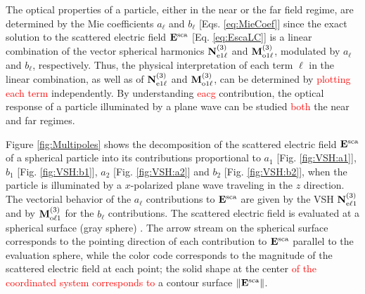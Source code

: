
The optical properties of a particle, either in the near or the far field regime,  are determined by the Mie coefficients   $a_\ell$ and $b_\ell$ [Eqs. \eqref{eq:MieCoef}] since the exact solution to the scattered electric field $\vb{E}^\text{sca}$ [Eq. \eqref{eq:EscaLC}] is a linear combination of the vector spherical harmonics $\vb{N}^{(3)}_{\text{e}1\ell}$ and $\vb{M}^{(3)}_{\text{o}1\ell}$, modulated by  $a_\ell$ and $b_\ell$, respectively. Thus, the physical interpretation of each term $\ell$ in the linear combination, as well as of $\vb{N}^{(3)}_{\text{e}1\ell}$ and $\vb{M}^{(3)}_{\text{o}1\ell}$, can be determined by \textcolor{red}{plotting each term} independently. By understanding \textcolor{red}{eacg} contribution, the optical response of a particle illuminated by a plane wave can be studied \textcolor{red}{both} the near and far regimes.

Figure \ref{fig:Multipoles} shows the decomposition of the scattered electric field  $\vb{E}^\text{sca}$ of a spherical particle into its contributions proportional to $a_1$ [Fig. \ref{fig:VSH:a1}], $b_1$ [Fig. \ref{fig:VSH:b1}], $a_2$ [Fig. \ref{fig:VSH:a2}] and $b_2$ [Fig. \ref{fig:VSH:b2}], when the particle is illuminated by a $x$-polarized plane wave traveling in the $z$ direction. The vectorial behavior of the $a_\ell$ contributions to $\vb{E}^\text{sca}$ are given by the VSH $\vb{N}^{(3)}_{\text{e}\ell 1}$ and by $\vb{M}^{(3)}_{\text{o}\ell 1}$ for the $b_\ell$ contributions. The  scattered electric field  is evaluated at a spherical surface (gray sphere) \textcolor{with radius larger than that of the scatterer}. The arrow stream on the spherical surface corresponds to the pointing direction of each contribution to $\vb{E}^\text{sca}$ parallel to the evaluation sphere, while the color code corresponds to the magnitude of the scattered electric field at each point; the solid shape at the center \textcolor{red}{of the coordinated system corresponds to} a contour surface $\norm{\vb{E}^\text{sca}}$.
%

